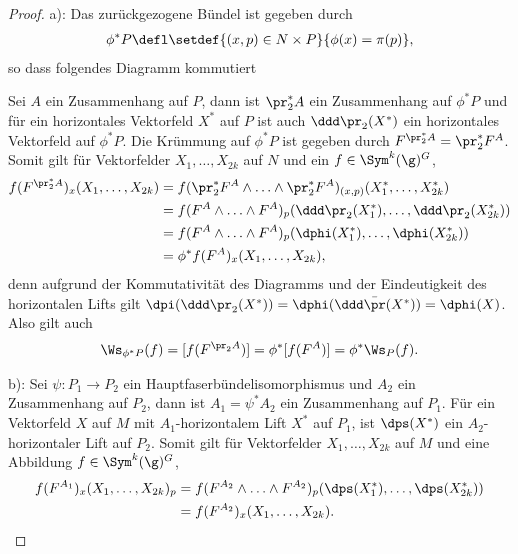 \documentclass[%
	paper=a5,%
	fleqn,%
	DIV=18,%
	BCOR=0mm,
	fontsize=11pt,
	titlepage=false,%
	bibliography=totoc,
	DIV=18,%
	twoside=true,
	pdftitle=Riemannsche Geometrie,
	pdfauthor=Uwe Semmelmann,
	numbers=noendperiod]%
	{scrbook}
\begin{document}
\begin{proof}
a): 
Das zurückgezogene Bündel ist gegeben durch
\begin{align*}
\phi^*P \defl \setdef{(x,p)\in N\times P}{\phi(x) = \pi(p)},
\end{align*}
so dass folgendes Diagramm kommutiert

{

\centering


}

Sei $A$ ein Zusammenhang auf $P$, dann ist $\pr_2^*A$ ein
Zusammenhang auf $\phi^*P$ und für ein horizontales Vektorfeld $X^*$ auf $P$
ist auch $\ddd \pr_2(X^*)$ ein horizontales Vektorfeld auf $\phi^*P$. Die
Krümmung auf $\phi^*P$ ist gegeben durch $F^{\pr_2^* A} = \pr_2^*
F^A$. Somit gilt für Vektorfelder $X_1,\ldots,X_{2k}$ auf $N$ und ein
$f\in \Sym^k(\g)^G$,
\begin{align*}
f(F^{\pr_2^*A})_x(X_1,\ldots,X_{2k})
&= 
f(\pr_2^* F^A \wedge \ldots\wedge \pr_2^* F^A)_{(x,p)}(X_1^*,\ldots,X_{2k}^*)\\
&= 
f(F^A \wedge \ldots\wedge
F^A)_{p}(\ddd\pr_2(X_1^*),\ldots,\ddd\pr_2(X_{2k}^*)) \\
&= f(F^A \wedge
\ldots\wedge F^A)_{p}(\dphi(X_1^*),\ldots,\dphi(X_{2k}^*)) \\
&= \phi^*
f(F^A)_x(X_1,\ldots,X_{2k}),
\end{align*}
denn aufgrund der Kommutativität des Diagramms und der Eindeutigkeit des
horizontalen Lifts gilt $\dpi(\ddd\pr_2(X^*)) = \dphi(\ddd\bar{\pr}(X^*)) =
\dphi(X)$. Also gilt auch
\begin{align*}
\Ws_{\phi^*P}(f) = [f(F^{\pr_2 A})] = \phi^*[f(F^A)]
= \phi^* \Ws_{P}(f).
\end{align*}

b): Sei $\psi: P_1\to P_2$ ein Hauptfaserbündelisomorphismus und $A_2$ ein
Zusammenhang auf $P_2$, dann ist $A_1=\psi^* A_2$ ein Zusammenhang auf $P_1$.
Für ein Vektorfeld $X$ auf $M$ mit $A_1$-horizontalem Lift $X^*$ auf $P_1$, ist
$\dps(X^*)$ ein $A_2$-horizontaler Lift auf $P_2$. Somit gilt für Vektorfelder
$X_1,\ldots,X_{2k}$ auf $M$ und eine Abbildung $f\in \Sym^k(\g)^G$,
\begin{align*}
f(F^{A_1})_x(X_1,\ldots,X_{2k})_p
&= f(F^{A_2}\wedge \ldots \wedge
F^{A_2})_p(\dps(X_1^*),\ldots,\dps(X_{2k}^*))\\ 
&= f(F^{A_2})_{x}(X_1,\ldots,X_{2k}).
\end{align*}


\end{proof}
\end{document}
